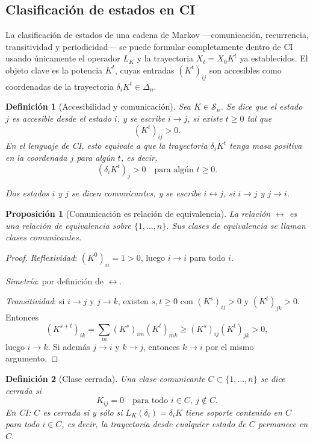 ﻿\documentclass[12pt]{article}
\newtheorem{definicion}{Definición}[section]
\newtheorem{proposicion}{Proposición}[section]
\begin{document}
\subsection{Clasificación de estados en CI}

La clasificación de estados de una cadena de Markov ---comunicación, recurrencia, transitividad y periodicidad--- se puede formular completamente dentro de CI usando únicamente el operador $L_K$ y la trayectoria $X_t = X_0 K^t$ ya establecidos. El objeto clave es la potencia $K^t$, cuyas entradas $(K^t)_{ij}$ son accesibles como coordenadas de la trayectoria $\delta_i K^t \in \Delta_n$.

\begin{definicion}[Accesibilidad y comunicación]\label{def:accesibilidad}
Sea $K\in\mathcal{S}_n$. Se dice que el estado $j$ es \emph{accesible} desde el estado $i$, y se escribe $i\to j$, si existe $t\ge 0$ tal que
\[
(K^t)_{ij} > 0.
\]
En el lenguaje de CI, esto equivale a que la trayectoria $\delta_i K^t$ tenga masa positiva en la coordenada $j$ para algún $t$, es decir,
\[
(\delta_i K^t)_j > 0 \quad \text{para algún } t\ge 0.
\]

Dos estados $i$ y $j$ se dicen \emph{comunicantes}, y se escribe $i\leftrightarrow j$, si $i\to j$ y $j\to i$.
\end{definicion}

\begin{proposicion}[Comunicación es relación de equivalencia]\label{prop:comunicacion_equivalencia}
La relación $\leftrightarrow$ es una relación de equivalencia sobre $\{1,\dots,n\}$. Sus clases de equivalencia se llaman \emph{clases comunicantes}.
\end{proposicion}

\begin{proof}
\emph{Reflexividad}: $(K^0)_{ii} = 1 > 0$, luego $i\to i$ para todo $i$.

\emph{Simetría}: por definición de $\leftrightarrow$.

\emph{Transitividad}: si $i\to j$ y $j\to k$, existen $s,t\ge 0$ con $(K^s)_{ij}>0$ y $(K^t)_{jk}>0$. Entonces
\[
(K^{s+t})_{ik} = \sum_m (K^s)_{im}(K^t)_{mk} \ge (K^s)_{ij}(K^t)_{jk} > 0,
\]
luego $i\to k$. Si además $j\to i$ y $k\to j$, entonces $k\to i$ por el mismo argumento.
\end{proof}

\begin{definicion}[Clase cerrada]\label{def:clase_cerrada}
Una clase comunicante $C\subset\{1,\dots,n\}$ se dice \emph{cerrada} si
\[
K_{ij} = 0 \quad \text{para todo } i\in C,\ j\notin C.
\]
En CI: $C$ es cerrada si y sólo si $L_K(\delta_i) = \delta_i K$ tiene soporte contenido en $C$ para todo $i\in C$, es decir, la trayectoria desde cualquier estado de $C$ permanece en $C$.
\end{definicion}
\end{document}
